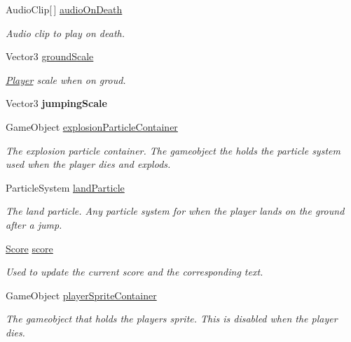 \begin{DoxyCompactItemize}
Audio\+Clip\mbox{[}$\,$\mbox{]} \hyperlink{class_infinite_jumper_1_1_player_a51f7e100113eb83a93e5d05f3e1ac5b2}{audio\+On\+Death}
\begin{DoxyCompactList}\small\item\em Audio clip to play on death. \end{DoxyCompactList}\item 
Vector3 \hyperlink{class_infinite_jumper_1_1_player_a03193a80fd21092d462ae40241eb77a5}{ground\+Scale}
\begin{DoxyCompactList}\small\item\em \hyperlink{class_infinite_jumper_1_1_player}{Player} scale when on groud. \end{DoxyCompactList}\item 
\hypertarget{class_infinite_jumper_1_1_player_a779300d7b0c923bbe0d99d5312b844a9}{}Vector3 {\bfseries jumping\+Scale}\label{class_infinite_jumper_1_1_player_a779300d7b0c923bbe0d99d5312b844a9}

\item 
Game\+Object \hyperlink{class_infinite_jumper_1_1_player_a7ceadd6a21d80a5ba1a346436a932e26}{explosion\+Particle\+Container}
\begin{DoxyCompactList}\small\item\em The explosion particle container. The gameobject the holds the particle system used when the player dies and explods. \end{DoxyCompactList}\item 
Particle\+System \hyperlink{class_infinite_jumper_1_1_player_a6377b4864639982c835b912f3dbe0552}{land\+Particle}
\begin{DoxyCompactList}\small\item\em The land particle. Any particle system for when the player lands on the ground after a jump. \end{DoxyCompactList}\item 
\hyperlink{class_infinite_jumper_1_1_score}{Score} \hyperlink{class_infinite_jumper_1_1_player_a908c55d32a3176d7d2a9ebd85212dc83}{score}
\begin{DoxyCompactList}\small\item\em Used to update the current score and the corresponding text. \end{DoxyCompactList}\item 
Game\+Object \hyperlink{class_infinite_jumper_1_1_player_a252f068cd18db2fc2872aecd78cea356}{player\+Sprite\+Container}
\begin{DoxyCompactList}\small\item\em The gameobject that holds the players sprite. This is disabled when the player dies. \end{DoxyCompactList}\end{DoxyCompactItemize}


